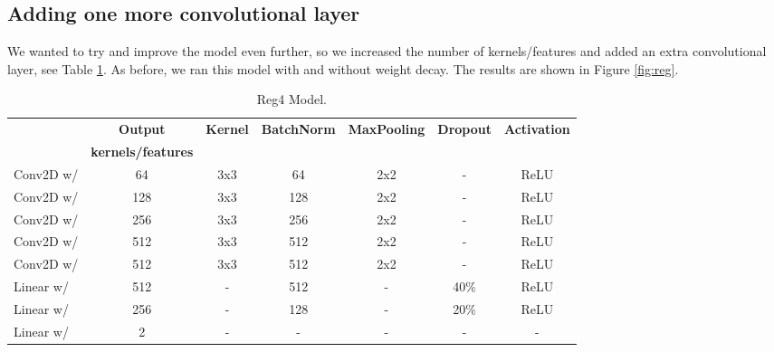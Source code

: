 \subsection{Adding one more convolutional layer}
We wanted to try and improve the model even further, so we increased the number of kernels/features and added an extra convolutional layer, see Table \ref{tab:reg_model}. As before, we ran this model with and without weight decay. The results are shown in Figure \ref{fig:reg}.
\begin{table}[H]
    \vspace*{-0.5cm}
    \centering
    \begin{tabular}{|l|c|c|c|c|c|c|}
    \hline
                & \textbf{Output}                   & \textbf{Kernel}   & \textbf{BatchNorm}    & \textbf{MaxPooling}   & \textbf{Dropout}  & \textbf{Activation}   \\
                & \textbf{kernels/features}         &                   &                       &                       &                   &                       \\ \hline
    Conv2D w/   & 64                                & 3x3               & 64                    & 2x2                   & -                 & ReLU                  \\ \hline
    Conv2D w/   & 128                               & 3x3               & 128                   & 2x2                   & -                 & ReLU                  \\ \hline
    Conv2D w/   & 256                               & 3x3               & 256                   & 2x2                   & -                 & ReLU                  \\ \hline
    Conv2D w/   & 512                               & 3x3               & 512                   & 2x2                   & -                 & ReLU                  \\ \hline
    Conv2D w/   & 512                               & 3x3               & 512                   & 2x2                   & -                 & ReLU                  \\ \hline
    Linear w/   & 512                               & -                 & 512                   & -                     & 40\%              & ReLU                  \\ \hline
    Linear w/   & 256                               & -                 & 128                   & -                     & 20\%              & ReLU                  \\ \hline
    Linear w/   & 2                                 & -                 & -                     & -                     & -                 & -                     \\ \hline
    \end{tabular}
    \caption{Reg4 Model.}
    \label{tab:reg_model}
    \vspace*{-0.8cm}
\end{table}

